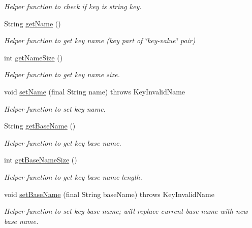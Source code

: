 \begin{DoxyCompactItemize}
\begin{DoxyCompactList}\small\item\em Helper function to check if key is string key. \end{DoxyCompactList}\item 
String \mbox{\hyperlink{classorg_1_1libelektra_1_1Key_a668626c8403940015ff5031cfa5e973c}{get\+Name}} ()
\begin{DoxyCompactList}\small\item\em Helper function to get key name (key part of \char`\"{}key-\/value\char`\"{} pair) \end{DoxyCompactList}\item 
int \mbox{\hyperlink{classorg_1_1libelektra_1_1Key_aa6477bb5eb12f739858f285650816cc6}{get\+Name\+Size}} ()
\begin{DoxyCompactList}\small\item\em Helper function to get key name size. \end{DoxyCompactList}\item 
void \mbox{\hyperlink{classorg_1_1libelektra_1_1Key_abd5602765701a10b6a10887c09810cf5}{set\+Name}} (final String name)  throws Key\+Invalid\+Name 	
\begin{DoxyCompactList}\small\item\em Helper function to set key name. \end{DoxyCompactList}\item 
String \mbox{\hyperlink{classorg_1_1libelektra_1_1Key_a32c556682f808bbc0a4b676879f6b86f}{get\+Base\+Name}} ()
\begin{DoxyCompactList}\small\item\em Helper function to get key base name. \end{DoxyCompactList}\item 
int \mbox{\hyperlink{classorg_1_1libelektra_1_1Key_a24bd83bcae08b956150d8ae3dafe738e}{get\+Base\+Name\+Size}} ()
\begin{DoxyCompactList}\small\item\em Helper function to get key base name length. \end{DoxyCompactList}\item 
void \mbox{\hyperlink{classorg_1_1libelektra_1_1Key_a5226472bedc6a02dee826ee3facdb25f}{set\+Base\+Name}} (final String base\+Name)  throws Key\+Invalid\+Name 	
\begin{DoxyCompactList}\small\item\em Helper function to set key base name; will replace current base name with new base name. \end{DoxyCompactList}\item 

\end{DoxyCompactItemize}
